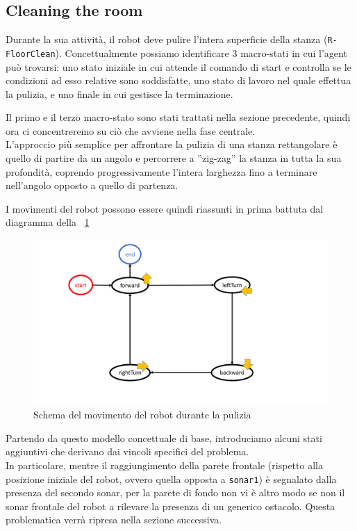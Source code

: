\documentclass{../llncs}
\newcommand{\code}[1]{{\color{blue}\small{\texttt{#1}}}}
\newcommand{\labelfig}[1]{\label{fig:#1}}
\newcommand{\xf}[1]{\figurename~\ref{fig:#1}}
\begin{document}
\subsection{Cleaning the room}
Durante la sua attività, il robot deve pulire l'intera superficie della stanza (\code{R-FloorClean}). Concettualmente possiamo identificare 3 macro-stati in cui l'agent può trovarsi: uno stato iniziale in cui attende il comando di start e controlla se le condizioni ad esso relative sono soddisfatte, uno stato di lavoro nel quale effettua la pulizia, e uno finale in cui gestisce la terminazione.

Il primo e il terzo macro-stato sono stati trattati nella sezione precedente, quindi ora ci concentreremo su ciò che avviene nella fase centrale.\\

L'approccio più semplice per affrontare la pulizia di una stanza rettangolare è quello di partire da un angolo e percorrere a ''zig-zag'' la stanza in tutta la sua profondità, coprendo progressivamente l'intera larghezza fino a terminare nell'angolo opposto a quello di partenza.

I movimenti del robot possono essere quindi riassunti in prima battuta dal diagramma della \xf{floorCleanDraft}

\begin{figure}[!htb]
\centering
\includegraphics[scale=0.45]{img/stateDiagramCleaningDraft.png}
\caption{Schema del movimento del robot durante la pulizia}\labelfig{floorCleanDraft}
\end{figure}

Partendo da questo modello concettuale di base, introduciamo alcuni stati aggiuntivi che derivano dai vincoli specifici del problema.\\

In particolare, mentre il raggiungimento della parete frontale (rispetto alla posizione iniziale del robot, ovvero quella opposta a \code{sonar1}) è segnalato dalla presenza del secondo sonar, per la parete di fondo non vi è altro modo se non il sonar frontale del robot a rilevare la presenza di un generico ostacolo. Questa problematica verrà ripresa nella sezione successiva.
\end{document}
